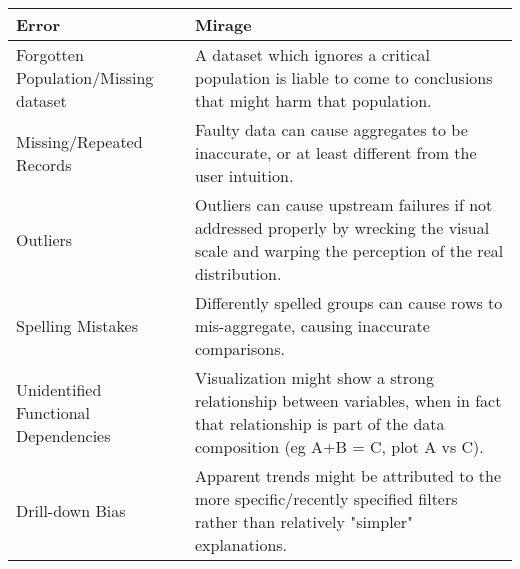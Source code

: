 
\begin{longtable}{p{5cm}p{12cm}}
\normalsize{Error} & \normalsize{Mirage}\\ \hline
   \rowcolor{colora}Forgotten Population/Missing dataset & A dataset which ignores a critical population is liable to come to conclusions that might harm that population. \cite{missingdatasets, correll2019ethical}\\
 \rowcolor{colora-opaque}Missing/Repeated Records & Faulty data can cause aggregates to be inaccurate, or at least different from the user intuition. \cite{kim2003taxonomy} \\
 \rowcolor{colora}Outliers & Outliers can cause upstream failures if not addressed properly by wrecking the visual scale and warping the perception of the real distribution.  \cite{kim2003taxonomy} \\
 \rowcolor{colora-opaque}Spelling Mistakes & Differently spelled groups can cause rows to mis-aggregate, causing inaccurate comparisons. \cite{wang2019uni}\\
 \rowcolor{colora}Unidentified Functional Dependencies & Visualization might show a strong relationship between variables, when in fact that relationship is part of the data composition (eg A+B = C, plot A vs C). \cite{wang2019uni}\\
 \rowcolor{colora-opaque}Drill-down Bias & Apparent trends might be attributed to the more specific/recently specified filters rather than relatively "simpler" explanations. \cite{lee2019avoiding}\\


\end{longtable}

